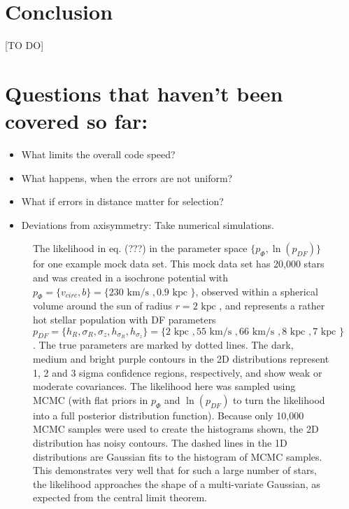 \documentclass[12pt,preprint]{aastex}
\begin{document}
\section{Conclusion}

[TO DO]

\section{Questions that haven't been covered so far:}

\begin{itemize}
\item What limits the overall code speed?
\item What happens, when the errors are not uniform?
\item What if errors in distance matter for selection?
\item Deviations from axisymmetry: Take numerical simulations.
\end{itemize}



\begin{figure}
\caption{The likelihood in eq. (???) in the parameter space $\{p_\Phi,\ln(p_{DF})\}$ for one example mock data set. This mock data set has 20,000 stars and was created in a isochrone potential with $p_\Phi = \{v_{circ},b \}=\{230 \text{ km/s },0.9\text{ kpc } \}$, observed within a spherical volume around the sun of radius $r = 2 \text{ kpc }$, and represents a rather hot stellar population with DF parameters $p_{DF} = \{ h_R, \sigma_R, \sigma_z,h_{\sigma_R},h_{\sigma_z}\} =\{2 \text{ kpc }, 55 \text{ km/s }, 66 \text{ km/s }, 8 \text{ kpc }, 7 \text{ kpc }\} $.  The true parameters are marked by dotted lines. The dark, medium and bright purple contours in the 2D distributions represent 1, 2 and 3 sigma confidence regions, respectively, and show weak or moderate covariances. The likelihood here was sampled using MCMC (with flat priors in $p_\Phi$ and  $\ln(p_{DF})$ to turn the likelihood into a full posterior distribution function). Because only 10,000 MCMC samples were used to create the histograms shown, the 2D distribution has noisy contours. The dashed lines in the 1D distributions are Gaussian fits to the histogram of MCMC samples. This demonstrates very well that for such a large number of stars, the likelihood approaches the shape of a multi-variate Gaussian, as expected from the central limit theorem.}
\end{figure}
\end{document}

